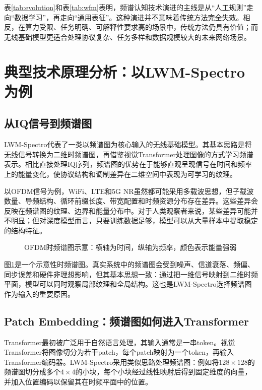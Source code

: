 \documentclass[UTF8,fontset=windows,zihao=-4]{ctexart}
\begin{document}
表\ref{tab:evolution}和表\ref{tab:wfm}表明，频谱认知技术演进的主线是从“人工规则”走向“数据学习”，再走向“通用表征”。这种演进并不意味着传统方法完全失效。相反，在算力受限、任务明确、可解释性要求高的场景中，传统方法仍具有价值；而无线基础模型更适合处理协议复杂、任务多样和数据规模较大的未来网络场景。

\clearpage
\section{典型技术原理分析：以LWM-Spectro为例}
\subsection{从IQ信号到频谱图}
LWM-Spectro代表了一类以频谱图为核心输入的无线基础模型\cite{lwm}。其基本思路是将无线信号转换为二维时频谱图，再借鉴视觉Transformer处理图像的方式学习频谱表示。相比直接处理IQ序列，频谱图的优势在于能够直观呈现信号在时间和频率上的能量变化，使协议结构和调制差异在二维空间中表现为可学习的纹理。

以OFDM信号为例，WiFi、LTE和5G NR虽然都可能采用多载波思想，但子载波数量、导频结构、循环前缀长度、带宽配置和时频资源分布存在差异。这些差异会反映在频谱图的纹理、边界和能量分布中。对于人类观察者来说，某些差异可能并不明显；但对深度模型而言，只要训练数据足够，模型可以从大量样本中提取稳定的结构特征。

\begin{figure}[H]
\centering
{}
\caption{OFDM时频谱图示意：横轴为时间，纵轴为频率，颜色表示能量强弱}
\label{fig:spectrogram-demo}
\end{figure}

图\ref{fig:spectrogram-demo}是一个示意性时频谱图。真实系统中的频谱图会受到噪声、信道衰落、频偏、同步误差和硬件非理想影响，但其基本思想一致：通过把一维信号映射到二维时频平面，模型可以同时观察局部纹理和全局结构。这也是LWM-Spectro选择频谱图作为输入的重要原因。

\subsection{Patch Embedding：频谱图如何进入Transformer}
Transformer最初被广泛用于自然语言处理，其输入通常是一串token。视觉Transformer将图像切分为若干patch，每个patch映射为一个token，再输入Transformer编码器\cite{dosovitskiy}。LWM-Spectro采用类似思路处理频谱图：例如将$128\times128$的频谱图切分成多个$4\times4$的小块，每个小块经过线性映射后得到固定维度的向量，并加入位置编码以保留其在时频平面中的位置。
\end{document}
